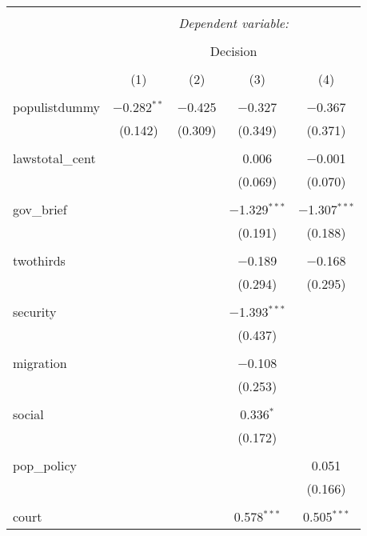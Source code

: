 
\begin{table}[!htbp] \centering 
  \caption{} 
  \label{} 
\begin{tabular}{@{\extracolsep{5pt}}lcccc} 
\\[-1.8ex]\hline 
\hline \\[-1.8ex] 
 & \multicolumn{4}{c}{\textit{Dependent variable:}} \\ 
\cline{2-5} 
\\[-1.8ex] & \multicolumn{4}{c}{Decision} \\ 
\\[-1.8ex] & (1) & (2) & (3) & (4)\\ 
\hline \\[-1.8ex] 
 populistdummy & $-$0.282$^{**}$ & $-$0.425 & $-$0.327 & $-$0.367 \\ 
  & (0.142) & (0.309) & (0.349) & (0.371) \\ 
  & & & & \\ 
 lawstotal\_cent &  &  & 0.006 & $-$0.001 \\ 
  &  &  & (0.069) & (0.070) \\ 
  & & & & \\ 
 gov\_brief &  &  & $-$1.329$^{***}$ & $-$1.307$^{***}$ \\ 
  &  &  & (0.191) & (0.188) \\ 
  & & & & \\ 
 twothirds &  &  & $-$0.189 & $-$0.168 \\ 
  &  &  & (0.294) & (0.295) \\ 
  & & & & \\ 
 security &  &  & $-$1.393$^{***}$ &  \\ 
  &  &  & (0.437) &  \\ 
  & & & & \\ 
 migration &  &  & $-$0.108 &  \\ 
  &  &  & (0.253) &  \\ 
  & & & & \\ 
 social &  &  & 0.336$^{*}$ &  \\ 
  &  &  & (0.172) &  \\ 
  & & & & \\ 
 pop\_policy &  &  &  & 0.051 \\ 
  &  &  &  & (0.166) \\ 
  & & & & \\ 
 court &  &  & 0.578$^{***}$ & 0.505$^{***}$ \\ 

\end{tabular}
\end{table}
